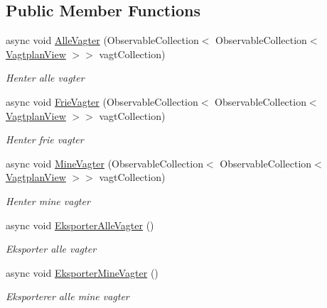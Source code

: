 \subsection*{Public Member Functions}
\begin{DoxyCompactItemize}
\item 
async void \hyperlink{class__1aarsproeve_1_1_view_model_1_1_vagtplan_view_model_a5684a550b7bd58a6c374c3a015764042}{Alle\+Vagter} (Observable\+Collection$<$ Observable\+Collection$<$ \hyperlink{class__1aarsproeve_1_1_model_1_1_vagtplan_view}{Vagtplan\+View} $>$$>$ vagt\+Collection)
\begin{DoxyCompactList}\small\item\em Henter alle vagter \end{DoxyCompactList}\item 
async void \hyperlink{class__1aarsproeve_1_1_view_model_1_1_vagtplan_view_model_ae72f0ee8b095efbd7ec2d0d57c114dde}{Frie\+Vagter} (Observable\+Collection$<$ Observable\+Collection$<$ \hyperlink{class__1aarsproeve_1_1_model_1_1_vagtplan_view}{Vagtplan\+View} $>$$>$ vagt\+Collection)
\begin{DoxyCompactList}\small\item\em Henter frie vagter \end{DoxyCompactList}\item 
async void \hyperlink{class__1aarsproeve_1_1_view_model_1_1_vagtplan_view_model_a1b79a60eb43f6670947298208e38692c}{Mine\+Vagter} (Observable\+Collection$<$ Observable\+Collection$<$ \hyperlink{class__1aarsproeve_1_1_model_1_1_vagtplan_view}{Vagtplan\+View} $>$$>$ vagt\+Collection)
\begin{DoxyCompactList}\small\item\em Henter mine vagter \end{DoxyCompactList}\item 
async void \hyperlink{class__1aarsproeve_1_1_view_model_1_1_vagtplan_view_model_aded65e8a981ff4dd63e1a583ef3da9cd}{Eksporter\+Alle\+Vagter} ()
\begin{DoxyCompactList}\small\item\em Eksporter alle vagter \end{DoxyCompactList}\item 
async void \hyperlink{class__1aarsproeve_1_1_view_model_1_1_vagtplan_view_model_a716adb448b19801ef8f78002e2ea6409}{Eksporter\+Mine\+Vagter} ()
\begin{DoxyCompactList}\small\item\em Eksporterer alle mine vagter \end{DoxyCompactList}\item 
$$
\end{DoxyCompactItemize}
